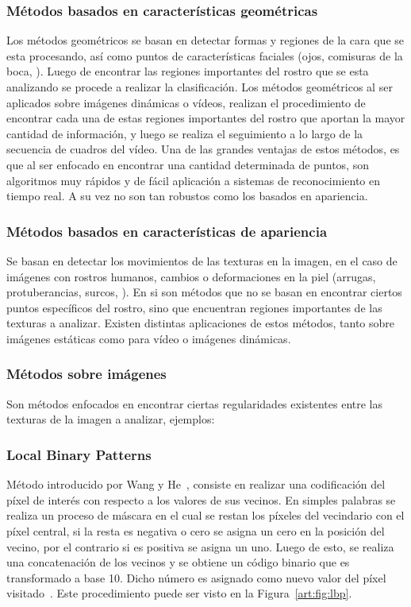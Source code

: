 \subsubsection{Métodos basados en características geométricas}
\label{sec:met_geo}
Los métodos geométricos se basan en detectar formas y regiones de la cara que se esta procesando, así como puntos de características faciales (\eg ojos, comisuras de la boca, \etc). 
Luego de encontrar las regiones importantes del rostro que se esta analizando se procede a realizar la clasificación. Los métodos geométricos al ser aplicados sobre imágenes dinámicas o vídeos, realizan el procedimiento de encontrar cada una de estas regiones importantes del rostro que aportan la mayor cantidad de información, y luego se realiza el seguimiento a lo largo de la secuencia de cuadros del vídeo. Una de las grandes ventajas de estos métodos, es que al ser enfocado en encontrar una cantidad determinada de puntos, son algoritmos muy rápidos y de fácil aplicación a sistemas de reconocimiento en tiempo real. A su vez no son tan robustos como los basados en apariencia.


\subsubsection{Métodos basados en características de apariencia}
\label{sec:met_apa}
Se basan en detectar los movimientos de las texturas en la imagen, en el caso de imágenes con rostros humanos, cambios o deformaciones en la piel (\eg arrugas, protuberancias, surcos, \etc). En si son métodos que no se basan en encontrar ciertos puntos específicos del rostro, sino que encuentran regiones importantes de las texturas a analizar. Existen distintas aplicaciones de estos métodos, tanto sobre imágenes estáticas como para vídeo o imágenes dinámicas.  

	\subsubsection{Métodos sobre imágenes}
	\label{sec:met_imagen}
		Son métodos enfocados en encontrar ciertas regularidades existentes entre las texturas de la imagen a analizar, ejemplos:

		\subsubsection{Local Binary Patterns}
		\label{sec:lbp}
		Método introducido por Wang y He~\cite{Wang1990}, consiste en realizar una codificación del píxel de interés con respecto a los valores de sus vecinos. En simples palabras se realiza un proceso de máscara en el cual se restan los píxeles del vecindario con el píxel central, si la resta es negativa o cero se asigna un cero en la posición del vecino, por el contrario si es positiva se asigna un uno. Luego de esto, se realiza una concatenación de los vecinos y se obtiene un código binario que es transformado a base 10. Dicho número es asignado como nuevo valor del píxel visitado~\cite{Ojala1994,Ojala2002,Ahonen2004,Shan2009}. Este procedimiento puede ser visto en la Figura~\ref{art:fig:lbp}.
		
